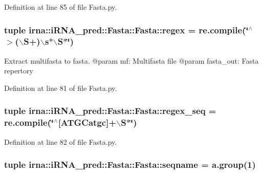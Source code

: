 \-Definition at line 85 of file \-Fasta.\-py.

\hypertarget{classirna_1_1iRNA__pred_1_1Fasta_1_1Fasta_a55b271085fb4580e9020e5b5f56839f0}{
\subsubsection[{regex}]{\setlength{\rightskip}{0pt plus 5cm}tuple {\bf irna\-::i\-R\-N\-A\-\_\-pred\-::\-Fasta\-::\-Fasta\-::regex} = re.\-compile(\char`\"{}$^\wedge$$>$($\backslash$\-S+)$\backslash$s$\ast$$\backslash$\-S$\ast$\char`\"{})}}
\label{classirna_1_1iRNA__pred_1_1Fasta_1_1Fasta_a55b271085fb4580e9020e5b5f56839f0}
\begin{DoxyVerb}
Extract multifasta to fasta.
@param mf: Multifasta file
@param fasta_out: Fasta repertory
\end{DoxyVerb}
 

\-Definition at line 81 of file \-Fasta.\-py.

\hypertarget{classirna_1_1iRNA__pred_1_1Fasta_1_1Fasta_a346e52c2005a75d59cf0aa55928766f3}{
\subsubsection[{regex\-\_\-seq}]{\setlength{\rightskip}{0pt plus 5cm}tuple {\bf irna\-::i\-R\-N\-A\-\_\-pred\-::\-Fasta\-::\-Fasta\-::regex\-\_\-seq} = re.\-compile(\char`\"{}$^\wedge$\mbox{[}\-A\-T\-G\-Catgc\mbox{]}+$\backslash$\-S$\ast$\char`\"{})}}
\label{classirna_1_1iRNA__pred_1_1Fasta_1_1Fasta_a346e52c2005a75d59cf0aa55928766f3}


\-Definition at line 82 of file \-Fasta.\-py.

\hypertarget{classirna_1_1iRNA__pred_1_1Fasta_1_1Fasta_af2a4acf2fd3a504ec7de90149e906d1a}{
\subsubsection[{seqname}]{\setlength{\rightskip}{0pt plus 5cm}tuple {\bf irna\-::i\-R\-N\-A\-\_\-pred\-::\-Fasta\-::\-Fasta\-::seqname} = a.\-group(1)}}
\label{classirna_1_1iRNA__pred_1_1Fasta_1_1Fasta_af2a4acf2fd3a504ec7de90149e906d1a}


